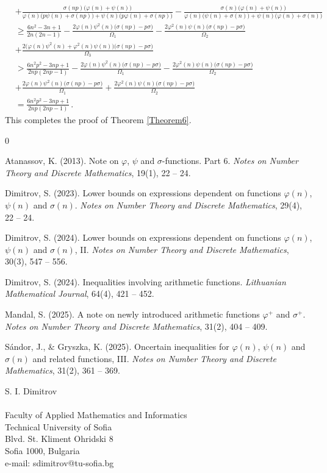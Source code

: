 \documentclass[12pt]{article}
\begin{document}
\begin{align*}
&+\frac{\sigma(np)\big(\varphi(n)+\psi(n)\big)}{\varphi(n)\big(p\psi(n)+\sigma(np)\big)+\psi(n)\big(p\varphi(n)+\sigma(np)\big)}
-\frac{\sigma(n)\big(\varphi(n)+\psi(n)\big)}{\varphi(n)\big(\psi(n)+\sigma(n)\big)+\psi(n)\big(\varphi(n)+\sigma(n)\big)}\\
&\geq\frac{6n^2-3n+1}{2n(2n-1)}-\frac{2\varphi(n)\psi^2(n)\big(\sigma(np)-p\sigma\big)}{\Omega_1}-\frac{2\varphi^2(n)\psi(n)\big(\sigma(np)-p\sigma\big)}{\Omega_2}\\
&+\frac{2\big(\varphi(n)\psi^2(n)+\varphi^2(n)\psi(n)\big)\big(\sigma(np)-p\sigma\big)}{\Omega_3}\\
&>\frac{6n^2p^2-3np+1}{2np(2np-1)}-\frac{2\varphi(n)\psi^2(n)\big(\sigma(np)-p\sigma\big)}{\Omega_1}-\frac{2\varphi^2(n)\psi(n)\big(\sigma(np)-p\sigma\big)}{\Omega_2}\\
&+\frac{2\varphi(n)\psi^2(n)\big(\sigma(np)-p\sigma\big)}{\Omega_1}+\frac{2\varphi^2(n)\psi(n)\big(\sigma(np)-p\sigma\big)}{\Omega_2}\\
&=\frac{6n^2p^2-3np+1}{2np(2np-1)}\,.
\end{align*}
This completes the proof of Theorem \ref{Theorem6}.


\begin{thebibliography}{0}

 Atanassov, K. (2013). Note on $\varphi$, $\psi$ and $\sigma$-functions. Part 6.
{\it Notes on Number Theory and Discrete Mathematics}, 19(1), 22 -- 24.

 Dimitrov, S. (2023). Lower bounds on expressions dependent on functions $\varphi(n)$, $\psi(n)$ and $\sigma(n)$.
{\it Notes on Number Theory and Discrete Mathematics}, 29(4), 22 -- 24.

 Dimitrov, S. (2024). Lower bounds on expressions dependent on functions $\varphi(n)$, $\psi(n)$ and $\sigma(n)$, II.
{\it Notes on Number Theory and Discrete Mathematics}, 30(3), 547 -- 556.

 Dimitrov, S. (2024). Inequalities involving arithmetic functions.
{\it Lithuanian Mathematical Journal}, 64(4), 421 -- 452.

 Mandal, S. (2025). A note on newly introduced arithmetic functions $\varphi^+$ and $\sigma^+$.
{\it Notes on Number Theory and Discrete Mathematics}, 31(2), 404 -- 409.

 S\'{a}ndor, J., $\&$ Gryszka, K. (2025). Oncertain inequalities for $\varphi(n)$, $\psi(n)$ and $\sigma(n)$ and related functions, III.
{\it Notes on Number Theory and Discrete Mathematics}, 31(2), 361 -- 369.

\end{thebibliography}



\vskip20pt
\footnotesize
\begin{flushleft}
S. I. Dimitrov\\
\quad\\
Faculty of Applied Mathematics and Informatics\\
Technical University of Sofia \\
Blvd. St. Kliment Ohridski 8 \\
Sofia 1000, Bulgaria\\
e-mail: sdimitrov@tu-sofia.bg\\
\end{flushleft}
\end{document}
